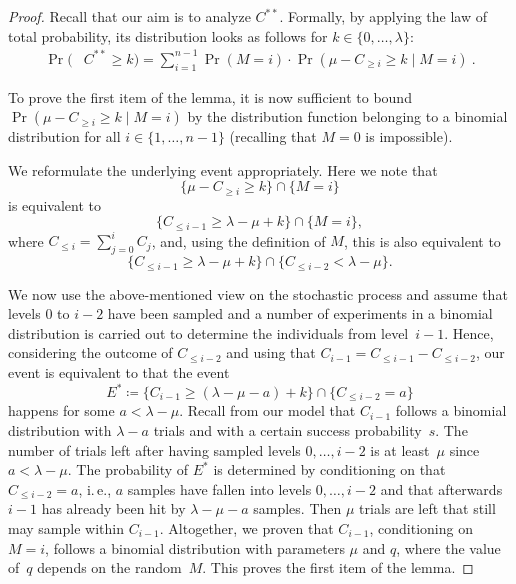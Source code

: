 \documentclass[11pt, a4paper]{article}
\newcommand*{\cumulC}[1]{C_{\geq #1}}
\newcommand{\ie}{i.\,e.\xspace}
\begin{document}
\begin{proof}
    Recall that our aim is to analyze $C^{**}$. 
		Formally, by applying the law of total probability, 
		its distribution looks as follows for $k \in \{0, \dots, \lambda\}$:
    \begin{equation}
    \begin{split}
    \Pr(&C^{**} \ge k) 
		= \sum_{i = 1}^{n -1} \Pr(M=i) \cdot \Pr(\mu-\cumulC{i}\ge k\mid M=i)\ .
    \end{split}
    \label{eq:cutLevelProbability}
		\end{equation}
		
    
		To prove the first item of the lemma, 
		it is now 
		sufficient to bound  $\Pr(\mu-\cumulC{i}\ge k\mid M=i)$ by the distribution function belonging to a binomial 
		distribution for all $i\in\{1,\dots,n-1\}$ (recalling that $M=0$ is impossible). 
		
		We reformulate the underlying event  appropriately. 
		Here we note that \[\{\mu-\cumulC{i}\ge k\}\cap \{M=i\}\] is equivalent to 
		\[
		\{C_{\le i-1}\ge \lambda-\mu+k\}\cap \{M=i\},
		\]
		where $C_{\le i}=\sum_{j = 0}^{i}C_j$, 
		and, using the definition of $M$, this is also equivalent to \[
		\{C_{\le i-1} \ge \lambda-\mu+k\} \cap 
		\{C_{\le i-2}< \lambda-\mu\}.\]
		
		We now use the above-mentioned  view on the stochastic process 
		 and assume that levels $0$ to $i-2$ have been sampled and a number of experiments 
		in a binomial distribution is carried out to determine the individuals 
		from level~$i-1$. Hence, considering the outcome of $C_{\le i-2}$ and using that $C_{i-1} = C_{\le i-1} - C_{\le i-2}$, 
		our event is equivalent to that the event
		\[
		E^*\coloneqq \{C_{i-1} \ge (\lambda-\mu-a) + k\big\} \cap \{C_{\le i-2} = a\} 	\]
		happens for some $a<\lambda-\mu$.
		Recall from our model that $C_{i-1}$ follows a binomial distribution with 
		$\lambda-a$ trials and with a certain success probability~$s$. The number of 
		trials left after having sampled levels $0,\dots,i-2$  is at least~$\mu$ since $a<\lambda-\mu$. 
		The probability of $E^*$ is determined by 
		conditioning  on that $C_{\le i-2}=a$, \ie, $a$ samples have fallen into levels 
		$0,\dots,i-2$ and that afterwards $i-1$ has already 
		been hit by $\lambda-\mu-a$ samples. Then $\mu$ trials are left 
		that still may sample within $C_{i-1}$. 
		 Altogether, we proven that 
		$C_{i-1}$, conditioning on~$M=i$, follows a binomial distribution with parameters $\mu$ and $q$, where 
		the value of~$q$ depends on the random~$M$. This proves the first item of the lemma.
		

\end{proof}
\end{document}
